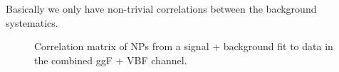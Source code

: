 Basically we only have non-trivial correlations between the background systematics.



\begin{figure}[htp]
\centering
{}
	\caption{Correlation matrix of NPs from a signal + background fit to data in the combined ggF + VBF channel.}
	\label{fig:ggf_vbf-correlation-matrix-corr-sm}
\end{figure}